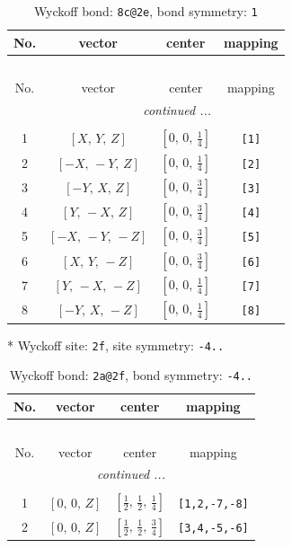 \documentclass[fleqn,8pt]{jsarticle}
\begin{document}
\renewcommand{\arraystretch}{1.2}
\begin{longtable}{cccc}
\caption{Wyckoff bond: {\tt 8c@2e}, bond symmetry: {\tt 1}}
 \\
 \hline \hline
No. & vector & center & mapping \\ \hline \endfirsthead

\multicolumn{3}{l}{\tablename\ \thetable{}} \\
 \hline \hline
No. & vector & center & mapping \\ \hline \endhead

 \hline \hline
\multicolumn{3}{r}{\footnotesize\it continued ...} \\ \endfoot

 \hline \hline
\multicolumn{3}{r}{} \\ \endlastfoot

1 & $\left[ X,\, Y,\, Z \right]$ & $\left[ 0,\, 0,\, \frac{1}{4} \right]$ & {\tt [1]} \\ \hline
2 & $\left[ - X,\, - Y,\, Z \right]$ & $\left[ 0,\, 0,\, \frac{1}{4} \right]$ & {\tt [2]} \\ \hline
3 & $\left[ - Y,\, X,\, Z \right]$ & $\left[ 0,\, 0,\, \frac{3}{4} \right]$ & {\tt [3]} \\ \hline
4 & $\left[ Y,\, - X,\, Z \right]$ & $\left[ 0,\, 0,\, \frac{3}{4} \right]$ & {\tt [4]} \\ \hline
5 & $\left[ - X,\, - Y,\, - Z \right]$ & $\left[ 0,\, 0,\, \frac{3}{4} \right]$ & {\tt [5]} \\ \hline
6 & $\left[ X,\, Y,\, - Z \right]$ & $\left[ 0,\, 0,\, \frac{3}{4} \right]$ & {\tt [6]} \\ \hline
7 & $\left[ Y,\, - X,\, - Z \right]$ & $\left[ 0,\, 0,\, \frac{1}{4} \right]$ & {\tt [7]} \\ \hline
8 & $\left[ - Y,\, X,\, - Z \right]$ & $\left[ 0,\, 0,\, \frac{1}{4} \right]$ & {\tt [8]} \\
\end{longtable}
* Wyckoff site: {\tt 2f}, site symmetry: {\tt -4..}
\renewcommand{\arraystretch}{1.2}
\begin{longtable}{cccc}
\caption{Wyckoff bond: {\tt 2a@2f}, bond symmetry: {\tt -4..}}
 \\
 \hline \hline
No. & vector & center & mapping \\ \hline \endfirsthead

\multicolumn{3}{l}{\tablename\ \thetable{}} \\
 \hline \hline
No. & vector & center & mapping \\ \hline \endhead

 \hline \hline
\multicolumn{3}{r}{\footnotesize\it continued ...} \\ \endfoot

 \hline \hline
\multicolumn{3}{r}{} \\ \endlastfoot

1 & $\left[ 0,\, 0,\, Z \right]$ & $\left[ \frac{1}{2},\, \frac{1}{2},\, \frac{1}{4} \right]$ & {\tt [1,2,-7,-8]} \\ \hline
2 & $\left[ 0,\, 0,\, Z \right]$ & $\left[ \frac{1}{2},\, \frac{1}{2},\, \frac{3}{4} \right]$ & {\tt [3,4,-5,-6]} \\
\end{longtable}
\end{document}
